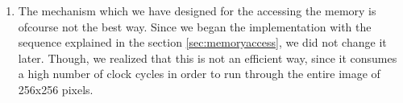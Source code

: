 \documentclass[11pt,a4paper]{article}
\begin{document}
\begin{enumerate}
\item The mechanism which we have designed for the accessing the memory is ofcourse not the best way. Since we began the implementation with the sequence explained in the section \ref{sec:memoryaccess}, we did not change it later. Though, we realized that this is not an efficient way, since it consumes a high number of clock cycles in order to run through the entire image of 256x256 pixels.
\end{enumerate}	
\end{document}
